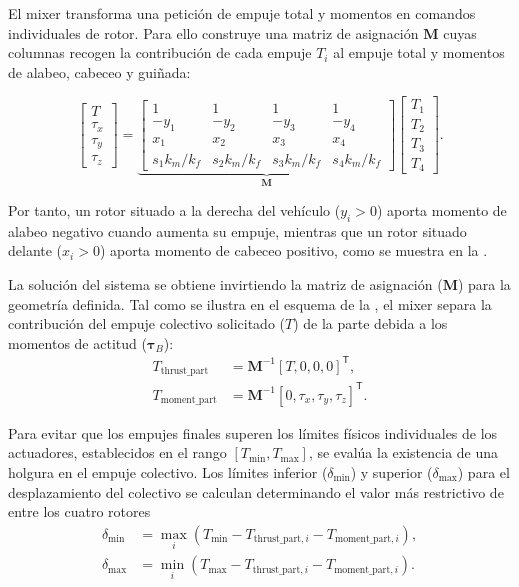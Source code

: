 El mixer transforma una petición de empuje total y momentos en comandos individuales 
de rotor. Para ello construye una matriz de asignación $\bm{M}$ cuyas columnas recogen 
la contribución de cada empuje $T_i$ al empuje total y momentos de alabeo, cabeceo y guiñada:

\begin{equation}
\begin{bmatrix}
T\\ \tau_x\\ \tau_y\\ \tau_z
\end{bmatrix}
=
\underbrace{
\begin{bmatrix}
1 & 1 & 1 & 1\\
-y_1 & -y_2 & -y_3 & -y_4\\
x_1 & x_2 & x_3 & x_4\\
s_1 k_m/k_f & s_2 k_m/k_f & s_3 k_m/k_f & s_4 k_m/k_f
\end{bmatrix}
}_{\bm{M}}
\begin{bmatrix}
T_1\\T_2\\T_3\\T_4
\end{bmatrix}.
\label{eq:matriz-mixer}
\end{equation}

Por tanto, un rotor situado a la derecha del vehículo
($y_i>0$) aporta momento de alabeo negativo cuando aumenta su empuje, mientras
que un rotor situado delante ($x_i>0$) aporta momento de cabeceo positivo, como se
muestra en la .

La solución del sistema se obtiene invirtiendo la matriz de asignación ($\bm{M}$) para
la geometría definida. Tal como se ilustra en el esquema de la ,
 el mixer separa la contribución del empuje colectivo solicitado ($T$) de la parte debida 
a los momentos de actitud ($\bm{\tau}_B$):
\begin{align}
 T_{\text{thrust\_part}} &= \bm{M}^{-1} [T, 0, 0, 0]^\mathsf{T}, \\
 T_{\text{moment\_part}} &= \bm{M}^{-1} [0, \tau_x, \tau_y, \tau_z]^\mathsf{T}.
\end{align}

Para evitar que los empujes finales superen los límites físicos individuales de los actuadores,
establecidos en el rango $[T_{\min}, T_{\max}]$, se evalúa la existencia de una holgura en el
empuje colectivo. Los límites inferior ($\delta_{\min}$) y superior ($\delta_{\max}$) para el 
desplazamiento del colectivo se calculan determinando el valor más restrictivo de entre los 
cuatro rotores
\begin{align}
 \delta_{\min} &= \max_i(T_{\min} - T_{\text{thrust\_part},i} - T_{\text{moment\_part},i}), \\
 \delta_{\max} &= \min_i(T_{\max} - T_{\text{thrust\_part},i} - T_{\text{moment\_part},i}).
\end{align}


